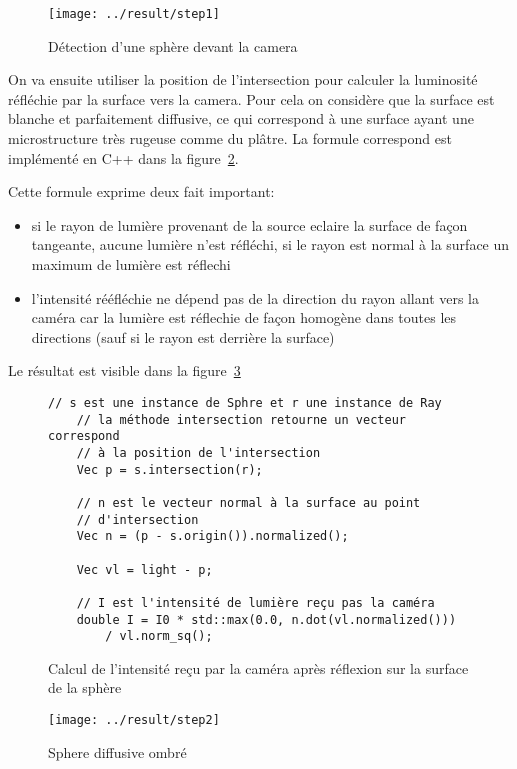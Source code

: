 \documentclass[12pt]{article}
\begin{document}
\begin{figure}
  \centering
  \texttt{[image: ../result/step1]}
  \caption{Détection d'une sphère devant la camera}\label{fig:step1}
\end{figure}

On va ensuite utiliser la position de l'intersection pour calculer la luminosité réfléchie par la surface vers la camera.
Pour cela on considère que la surface est blanche et parfaitement diffusive, ce qui correspond à une surface ayant une microstructure très rugeuse comme du plâtre.
La formule correspond est implémenté en C++ dans la figure~\ref{code:platre}.

Cette formule exprime deux fait important:
\begin{itemize}
    \item si le rayon de lumière provenant de la source eclaire la surface de façon tangeante, aucune lumière n'est réfléchi, si le rayon est normal à la surface un maximum de lumière est réflechi
    \item l'intensité rééfléchie ne dépend pas de la direction du rayon allant vers la caméra car la lumière est réflechie de façon homogène dans toutes les directions (sauf si le rayon est derrière la surface)
\end{itemize}

Le résultat est visible dans la figure~\ref{fig:step2}

\begin{figure}[ht]
  \begin{lstlisting}[frame=single]
    // s est une instance de Sphre et r une instance de Ray
    // la méthode intersection retourne un vecteur correspond
    // à la position de l'intersection
    Vec p = s.intersection(r);

    // n est le vecteur normal à la surface au point
    // d'intersection
    Vec n = (p - s.origin()).normalized();

    Vec vl = light - p;

    // I est l'intensité de lumière reçu pas la caméra
    double I = I0 * std::max(0.0, n.dot(vl.normalized()))
        / vl.norm_sq();
  \end{lstlisting}
  \caption{Calcul de l'intensité reçu par la caméra après réflexion sur la surface de la sphère}\label{code:platre}
\end{figure}

\begin{figure}[ht]
  \centering
  \texttt{[image: ../result/step2]}
  \caption{Sphere diffusive ombré}\label{fig:step2}
\end{figure}
\end{document}

